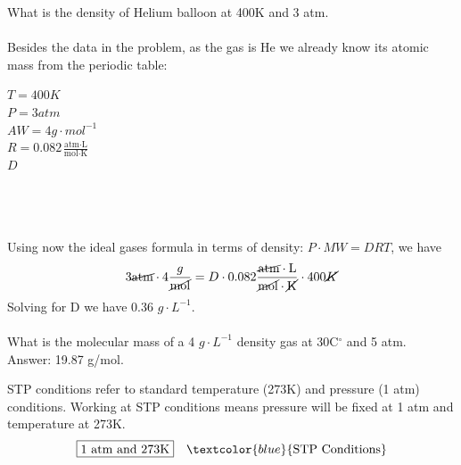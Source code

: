 \documentclass[main.tex]{subfiles}
\begin{document}
\begin{description}
\begin{example} %
What is the density of Helium balloon at 400K and 3 atm.
\\
\\
Besides the data in the problem, as the gas is He we already know its atomic mass from the periodic table:
\begin{tcbitemize}[raster columns=3, raster rows=3, enhanced, sharp corners, raster equal height=rows, raster force size=false, raster column skip=0pt, raster row skip = 0pt]
\tcbitem[blankest, width=1cm]
\tcbitem[header = helpful]
\texta
\tcbitem[header = harmful]
\textb
\tcbitem[firstcol = internal]
\textcn
\tcbitem[swotbox = G]
$T=400K$\\
$P=3atm$\\
$AW=4 g\cdot mol^{-1}$\\
$R=0.082\frac{\text{atm}\cdot \text{L}}{\text{mol}\cdot \text{K}}$\\
\tcbitem[swotbox = A]
$D$\\
\\
\\
\\
\end{tcbitemize}%
Using now the ideal gases formula in terms of density: $P\cdot MW=DRT$, we have
\begin{equation*}
3 \cancel{\text{atm}}\cdot 4\frac{g}{\cancel{\text{mol}}}=D\cdot 0.082\frac{\cancel{\text{atm}}\cdot \text{L}}{\cancel{\text{mol}}\cdot \cancel{\text{K}}}\cdot 400\cancel{K}
\end{equation*}
Solving for D we have 0.36 $g\cdot L^{-1}$.
\\
\faDiamond\ \\
What is the molecular mass of a 4 $g\cdot L^{-1}$ density gas at 30C$^{\circ}$ and 5 atm.
\\
\flushright Answer: 19.87 g/mol.
\end{example}%
\item[\docfilehook{STP conditions}{STP conditions}] 
STP conditions refer to standard temperature (273K) and pressure (1 atm) conditions. Working at STP conditions means pressure will be fixed at 1 atm and temperature at 273K.%
\begin{equation*}
\boxed{  \text{1 atm and 273K}  } \quad \textcolor{blue}{\text{STP Conditions}}

\end{equation*}
\end{description}
\end{document}
